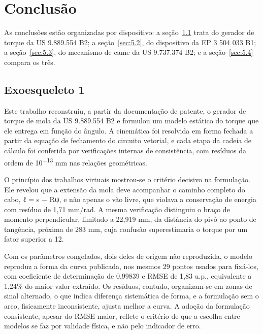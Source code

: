 
\chapter{Conclusão}\label{sec:5}

As conclusões estão organizadas por dispositivo: a seção~\ref{sec:5.1} trata do gerador de torque da US 9.889.554 B2; a seção~\ref{sec:5.2}, do dispositivo da EP 3 504 033 B1; a seção~\ref{sec:5.3}, do mecanismo de came da US 9.737.374 B2; e a seção~\ref{sec:5.4} compara os três.

\section{Exoesqueleto 1}\label{sec:5.1}

Este trabalho reconstruiu, a partir da documentação de patente, o gerador de torque de mola da US 9.889.554 B2 e formulou um modelo estático do torque que ele entrega em função do ângulo. A cinemática foi resolvida em forma fechada a partir da equação de fechamento do circuito vetorial, e cada etapa da cadeia de cálculo foi conferida por verificações internas de consistência, com resíduos da ordem de 10\textsuperscript{−13} mm nas relações geométricas.

O princípio dos trabalhos virtuais mostrou-se o critério decisivo na formulação. Ele revelou que a extensão da mola deve acompanhar o caminho completo do cabo, ℓ = s − Rψ, e não apenas o vão livre, que violava a conservação de energia com resíduo de 1,71 mm/rad. A mesma verificação distinguiu o braço de momento perpendicular, limitado a 22,919 mm, da distância do pivô ao ponto de tangência, próxima de 283 mm, cuja confusão superestimaria o torque por um fator superior a 12.

Com os parâmetros congelados, dois deles de origem não reproduzida, o modelo reproduz a forma da curva publicada, nos mesmos 29 pontos usados para fixá-los, com coeficiente de determinação de 0,99839 e RMSE de 1,83 u.p., equivalente a 1,24\% do maior valor extraído. Os resíduos, contudo, organizam-se em zonas de sinal alternado, o que indica diferença sistemática de forma, e a formulação sem o arco, fisicamente inconsistente, ajusta melhor a curva. A adoção da formulação consistente, apesar do RMSE maior, reflete o critério de que a escolha entre modelos se faz por validade física, e não pelo indicador de erro.

